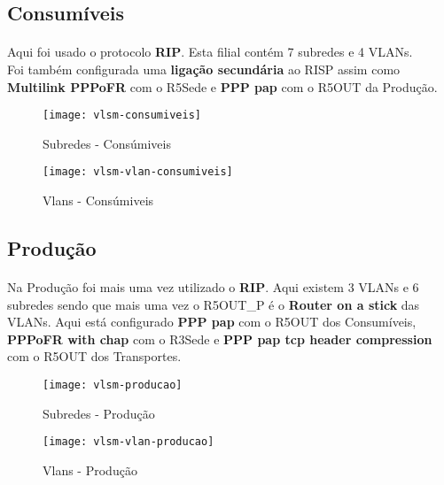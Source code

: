 \documentclass[11pt]{article}
\begin{document}
	\subsection{Consumíveis}
	\normalsize
	\paragraph{}
        Aqui foi usado o protocolo \textbf{RIP}. Esta filial contém 7 subredes e 4 VLANs.\\
        Foi também configurada uma \textbf{ligação secundária} ao RISP assim como \textbf{Multilink PPPoFR} com o R5Sede e \textbf{PPP pap} com o R5OUT da Produção. 

	\begin{figure}[h]
		\centering
		\texttt{[image: vlsm-consumiveis]}
		\caption{Subredes - Consúmiveis}
		\label{fig.nav}
              \end{figure}

              	\begin{figure}[h]
		\centering
		\texttt{[image: vlsm-vlan-consumiveis]}
		\caption{Vlans - Consúmiveis}
		\label{fig.nav}
	\end{figure}


	\pagebreak

	\subsection{Produção}
	\normalsize
	\paragraph{}
        Na Produção foi mais uma vez utilizado o \textbf{RIP}. Aqui existem 3 VLANs e 6 subredes sendo que mais uma vez o R5OUT\_P é o \textbf{Router on a stick} das VLANs.
        Aqui está configurado \textbf{PPP pap} com o R5OUT dos Consumíveis, \textbf{PPPoFR with chap} com o R3Sede e \textbf{PPP pap tcp header compression} com o R5OUT dos Transportes.

        \begin{figure}[h]
          \centering
          \texttt{[image: vlsm-producao]}
          \caption{Subredes - Produção}
          \label{fig.nav}
        \end{figure}

        \begin{figure}[h]
          \centering
          \texttt{[image: vlsm-vlan-producao]}
          \caption{Vlans - Produção}
          \label{fig.nav}
	\end{figure}
\end{document}

